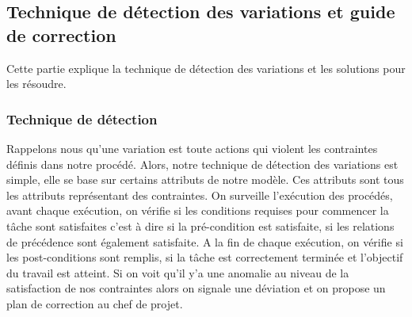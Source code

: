 \subsection{Technique de détection des variations et guide de correction}
Cette partie explique la technique de détection des variations et les solutions pour les résoudre.
\subsubsection*{Technique de détection}
Rappelons nous qu'une variation est toute actions qui violent les contraintes définis dans notre procédé.
Alors, notre technique de détection des variations est simple, elle se base sur certains attributs de notre modèle.
Ces attributs sont tous les attributs représentant des contraintes. On surveille l'exécution des procédés, avant chaque exécution, on vérifie si les conditions requises pour commencer la tâche sont satisfaites c'est à dire si la pré-condition est satisfaite, si les relations de précédence sont également satisfaite. A la fin de chaque exécution, on vérifie si les post-conditions sont remplis, si la tâche est correctement terminée et l'objectif du travail est atteint. Si on voit qu'il y'a une anomalie au niveau de la satisfaction de nos contraintes alors on signale une déviation et on propose un plan de correction au chef de projet.
